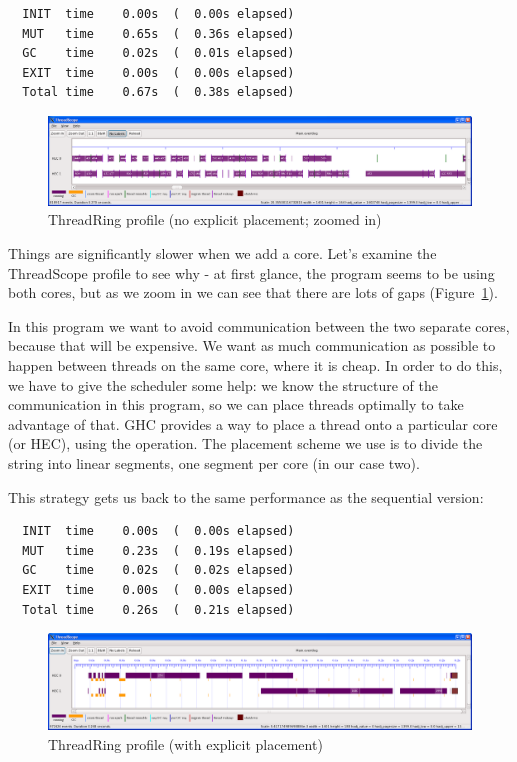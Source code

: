 \begin{verbatim}
  INIT  time    0.00s  (  0.00s elapsed)
  MUT   time    0.65s  (  0.36s elapsed)
  GC    time    0.02s  (  0.01s elapsed)
  EXIT  time    0.00s  (  0.00s elapsed)
  Total time    0.67s  (  0.38s elapsed)
\end{verbatim}

\begin{figure}
\begin{center}
\includegraphics[scale=0.3]{threadring1.png}
\end{center}
\caption{ThreadRing profile (no explicit placement; zoomed in)}
\label{f:threadring1}
\end{figure}

Things are significantly slower when we add a core.  Let's examine the
ThreadScope profile to see why - at first glance, the program seems to
be using both cores, but as we zoom in we can see that there are lots
of gaps (Figure~\ref{f:threadring1}).  

In this program we want to avoid communication between the two
separate cores, because that will be expensive.  We want as much
communication as possible to happen between threads on the same core,
where it is cheap.  In order to do this, we have to give the scheduler
some help: we know the structure of the communication in this program,
so we can place threads optimally to take advantage of that.  GHC
provides a way to place a thread onto a particular core (or HEC),
using the  operation.  The placement scheme we use is
to divide the string into linear segments, one segment per core (in
our case two).

This strategy gets us back to the same performance as the sequential
version:

\begin{verbatim}
  INIT  time    0.00s  (  0.00s elapsed)
  MUT   time    0.23s  (  0.19s elapsed)
  GC    time    0.02s  (  0.02s elapsed)
  EXIT  time    0.00s  (  0.00s elapsed)
  Total time    0.26s  (  0.21s elapsed)
\end{verbatim}

\begin{figure}
\begin{center}
\includegraphics[scale=0.3]{threadring2.png}
\end{center}
\caption{ThreadRing profile (with explicit placement)}
\label{f:threadring2}
\end{figure}

